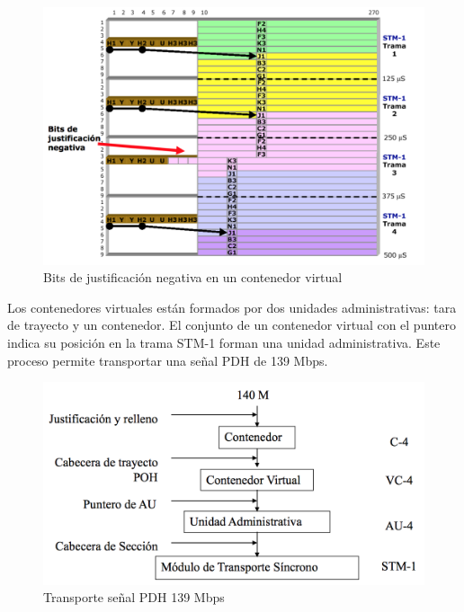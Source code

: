\documentclass[10pt,portrait, twocolumn]{article}
\begin{document}
	\begin{figure}[!ht]
 		\centering
  		 \includegraphics[scale = 0.4]{images/VCNeg}
		\caption{Bits de justificación negativa en un contenedor virtual}
	\end{figure}
	
Los contenedores virtuales están formados por dos unidades administrativas: tara de trayecto y un contenedor. El conjunto de un contenedor virtual con el puntero indica su posición en la trama STM-1 forman una unidad administrativa. Este proceso permite transportar una señal PDH de 139 Mbps.

	\begin{figure}[!ht]
 		\centering
  		 \includegraphics[scale = 0.4]{images/VC3}
		\caption{Transporte señal PDH 139 Mbps}
	\end{figure}
\end{document}
